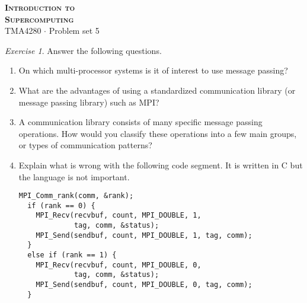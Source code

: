 \documentclass[onecolumn, oneside, a4paper, 11pt]{memoir}
\theoremstyle{remark}
\newtheorem{ex}{Exercise}
\begin{document}
\pagestyle{empty}

\begin{center}
  {\Huge \bfseries \scshape
    Introduction to \\[0.2\baselineskip] Supercomputing} \\[2\baselineskip]
  {\Large TMA4280 $\cdot$ Problem set 5} \\[2\baselineskip]
\end{center}

\begin{ex} Answer the following questions.
  \begin{enumerate}
  \item On which multi-processor systems is it of interest to use message
    passing?
  \item What are the advantages of using a standardized communication library
    (or message passing library) such as MPI?
  \item A communication library consists of many specific message passing
    operations. How would you classify these operations into a few main groups,
    or types of communication patterns?
  \item Explain what is wrong with the following code segment. It is written in
    C but the language is not important.
    \begin{lstlisting}[style=c]
  MPI_Comm_rank(comm, &rank);
  if (rank == 0) {
    MPI_Recv(recvbuf, count, MPI_DOUBLE, 1,
             tag, comm, &status);
    MPI_Send(sendbuf, count, MPI_DOUBLE, 1, tag, comm);
  }
  else if (rank == 1) {
    MPI_Recv(recvbuf, count, MPI_DOUBLE, 0,
             tag, comm, &status);
    MPI_Send(sendbuf, count, MPI_DOUBLE, 0, tag, comm);
  }
    \end{lstlisting}
  \end{enumerate}
\end{ex}
\end{document}
